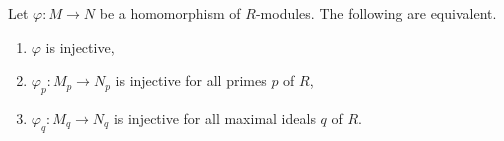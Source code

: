 Let $\varphi\colon M\to N$ be a homomorphism of $R$-modules. The following are
equivalent.
\begin{enumerate}[label=(\roman*)]
	\item $\varphi$ is injective,
	\item $\varphi_p\colon M_p\to N_p$ is injective for all primes $p$ of $R$,
	\item $\varphi_q\colon M_q\to N_q$ is injective for all maximal ideals $q$
		of $R$.
\end{enumerate}
